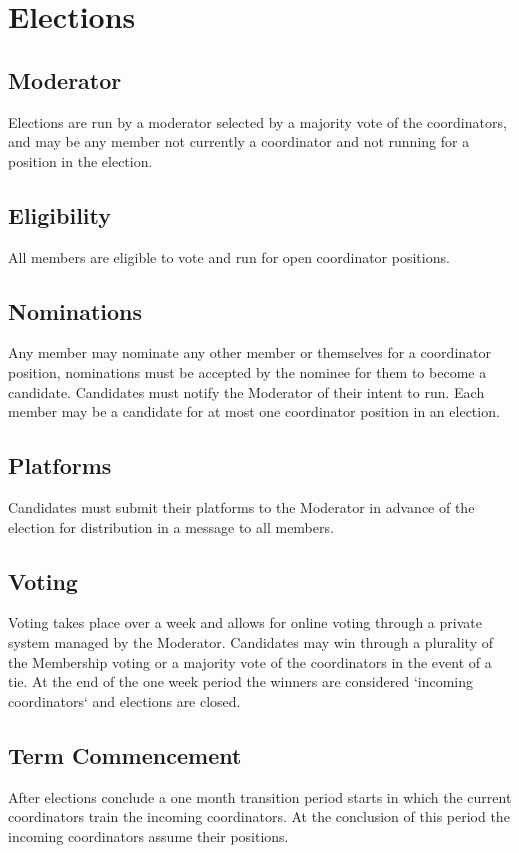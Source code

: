 \chapter{Elections}\label{sec:elections}

\section{Moderator}\label{sec:moderator}
Elections are run by a moderator selected by a majority vote of the coordinators, and may be any member not currently a coordinator and not running for a position in the election.

\section{Eligibility}\label{sec:eligibility}
All members are eligible to vote and run for open coordinator positions.

\section{Nominations}\label{sec:nominations}
Any member may nominate any other member or themselves for a coordinator position, nominations must be accepted by the nominee for them to become a candidate. Candidates must notify the Moderator of their intent to run. Each member may be a candidate for at most one coordinator position in an election.

\section{Platforms}\label{sec:platforms}
Candidates must submit their platforms to the Moderator in advance of the election for distribution in a message to all members.

\section{Voting}\label{sec:voting}
Voting takes place over a week and allows for online voting through a private system managed by the Moderator. Candidates may win through a plurality of the Membership voting or a majority vote of the coordinators in the event of a tie. At the end of the one week period the winners are considered `incoming coordinators` and elections are closed.

\section{Term Commencement}\label{sec:term_commencement}
After elections conclude a one month transition period starts in which the current coordinators train the incoming coordinators. At the conclusion of this period the incoming coordinators assume their positions.
